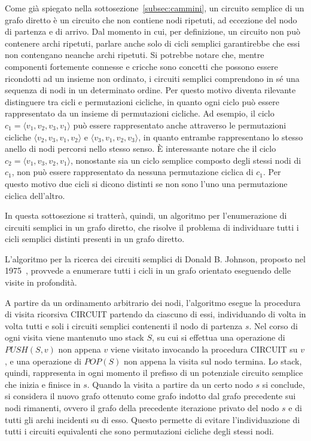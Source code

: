 Come gi\`a spiegato nella sottosezione~\ref{subsec:cammini}, un circuito semplice di un grafo diretto è un circuito
che non contiene nodi ripetuti, ad eccezione del nodo di partenza e di arrivo.
Dal momento in cui, per definizione, un circuito non pu\`o contenere archi ripetuti, parlare anche solo di cicli
semplici garantirebbe che essi non contengano neanche archi ripetuti.
Si potrebbe notare che, mentre componenti fortemente connesse e cricche sono concetti che possono essere
ricondotti ad un insieme non ordinato, i circuiti semplici comprendono in s\'e una sequenza di nodi in un determinato
ordine.
Per questo motivo diventa rilevante distinguere tra cicli e permutazioni cicliche, in quanto ogni ciclo
pu\`o essere rappresentato da un insieme di permutazioni cicliche.
Ad esempio, il ciclo $c_1 = \langle v_1, v_2, v_3, v_1 \rangle$ pu\`o essere rappresentato anche attraverso le
permutazioni cicliche $\langle v_2, v_3, v_1, v_2 \rangle$ e $\langle v_3, v_1, v_2, v_3 \rangle$, in quanto entrambe
rappresentano lo stesso anello di nodi percorsi nello stesso senso.
\`E interessante notare che il ciclo $c_2 = \langle v_1, v_3, v_2, v_1 \rangle$, nonostante sia un ciclo semplice
composto degli stessi nodi di $c_1$, non pu\`o essere rappresentato da nessuna permutazione ciclica di $c_1$.
Per questo motivo due cicli si dicono distinti se non sono l'uno una permutazione ciclica dell'altro. \newline

In questa sottosezione si tratterà, quindi, un algoritmo per l'enumerazione di circuiti semplici in un grafo diretto, che
risolve il problema di individuare tutti i cicli semplici distinti presenti in un grafo diretto.
\newpage


L'algoritmo per la ricerca dei circuiti semplici di Donald B. Johnson, proposto nel 1975~\cite{doi:10.1137/0204007},
provvede a enumerare tutti i cicli in un grafo orientato eseguendo delle visite in profondit\`a.

A partire da un ordinamento arbitrario dei nodi, l'algoritmo esegue la procedura di visita ricorsiva CIRCUIT partendo
da ciascuno di essi, individuando di volta in volta tutti e soli i circuiti semplici contenenti il nodo di partenza $s$.
Nel corso di ogni visita viene mantenuto uno stack $S$, su cui si effettua una operazione di $PUSH(S, v)$ non
appena $v$ viene visitato invocando la procedura CIRCUIT su $v$, e una operazione di $POP(S)$ non appena la visita
sul nodo termina.
Lo stack, quindi, rappresenta in ogni momento il prefisso di un potenziale circuito semplice che inizia e finisce in $s$.
Quando la visita a partire da un certo nodo $s$ si conclude, si considera il nuovo grafo ottenuto come grafo indotto
dal grafo precedente sui nodi rimanenti, ovvero il grafo della precedente iterazione privato del nodo $s$ e di tutti
gli archi incidenti su di esso.
Questo permette di evitare l'individuazione di tutti i circuiti equivalenti che sono permutazioni cicliche degli stessi
nodi.

